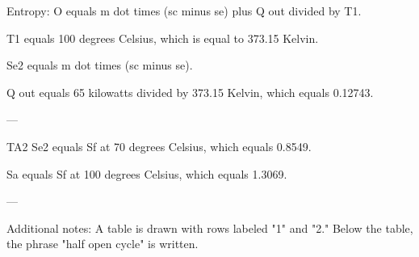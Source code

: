 Entropy:  
O equals m dot times (sc minus se) plus Q out divided by T1.  

T1 equals 100 degrees Celsius, which is equal to 373.15 Kelvin.  

Se2 equals m dot times (sc minus se).  

Q out equals 65 kilowatts divided by 373.15 Kelvin, which equals 0.12743.  

---

TA2  
Se2 equals Sf at 70 degrees Celsius, which equals 0.8549.  

Sa equals Sf at 100 degrees Celsius, which equals 1.3069.  

---

Additional notes:  
A table is drawn with rows labeled "1" and "2." Below the table, the phrase "half open cycle" is written.